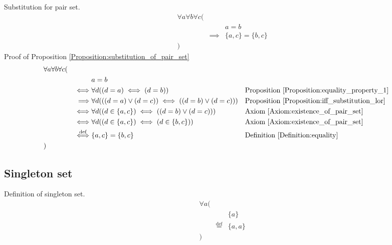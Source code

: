 \begin{prop}
\label{Proposition:substitution_of_pair_set}
Substitution for pair set.
\begin{align*}
& \forall a \forall b \forall c ( \\
& & & a = b \\
& & \implies & \{ a , c \} = \{ b , c \} \\
& )
\end{align*}
Proof of Proposition \ref{Proposition:substitution_of_pair_set}
\begin{align*}
& \forall a \forall b \forall c ( \\
& & & a = b \\
& & \iff & \forall d ((d = a) \iff (d = b))
& & \text{Proposition \ref{Proposition:equality_property_1}} \\
& & \implies & \forall d (((d = a) \lor (d = c)) \iff ((d = b) \lor (d = c)))
& & \text{Proposition \ref{Proposition:iff_substitution_lor}} \\
& & \iff & \forall d ((d \in \{ a , c \}) \iff ((d = b) \lor (d = c)))
& & \text{Axiom \ref{Axiom:existence_of_pair_set}} \\
& & \iff & \forall d ((d \in \{ a , c \}) \iff (d \in \{ b , c \}))
& & \text{Axiom \ref{Axiom:existence_of_pair_set}} \\
& & \overset{\operatorname{def}}{\iff} & \{ a , c \} = \{ b , c \}
& & \text{Definition \ref{Definition:equality}} \\
& )
\end{align*}
\end{prop}

\subsection{Singleton set}
\begin{defn}
\label{Definition:singleton_set}
Definition of singleton set.
\begin{align*}
& \forall a ( \\
& & & \{ a \} \\
& & \overset{\operatorname{def}}{=} & \{ a , a \} \\
& )
\end{align*}
\end{defn}

